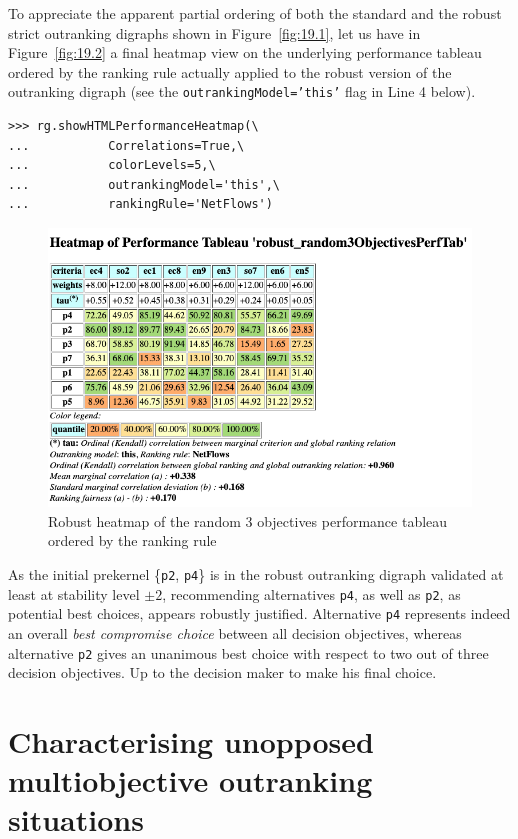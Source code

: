 To appreciate the apparent partial ordering of both the standard and the robust strict outranking digraphs shown in Figure~\vref{fig:19.1}, let us have in Figure~\vref{fig:19.2} a final heatmap view on the underlying performance tableau ordered by the \NetFlows ranking rule actually applied to the robust version of the outranking digraph (see the \texttt{outrankingModel='this'} flag in Line 4 below).
\begin{lstlisting}[caption={Computing a robust performance heatmap view},label=list:19.9]
>>> rg.showHTMLPerformanceHeatmap(\
...           Correlations=True,\
...           colorLevels=5,\
...           outrankingModel='this',\
...           rankingRule='NetFlows')
\end{lstlisting}
\begin{figure}[ht]
\includegraphics[width=\hsize]{Figures/19-2-robustHeatmap.png}
\caption{Robust heatmap of the random 3 objectives performance tableau ordered by the \NetFlows ranking rule} 
\label{fig:19.2}       %
\end{figure}

As the initial prekernel \{\texttt{p2}, \texttt{p4}\} is in the robust outranking digraph validated at least at stability level $\pm 2$, recommending alternatives \texttt{p4}, as well as \texttt{p2}, as potential best choices, appears robustly justified. Alternative \texttt{p4} represents indeed an overall \emph{best compromise choice} between all decision objectives, whereas alternative \texttt{p2} gives an unanimous best choice with respect to two out of three decision objectives. Up to the decision maker to make his final choice.

\section{Characterising unopposed multiobjective outranking situations}
\label{sec:19.5}

